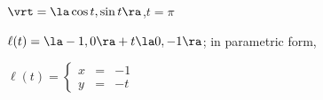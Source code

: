 {$\vrt = \la \cos t,\sin t \ra$,\quad $t=\pi$
}
{$\ell(t) = \la -1,0\ra + t\la 0,-1\ra$; in parametric form,

$\ell(t) = \left\{\begin{array}{ccc} x&=&-1 \\ y &=& -t\end{array}\right.$
}
